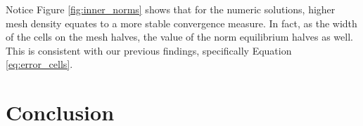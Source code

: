 \documentclass[12pt]{article}
\begin{document}
Notice Figure \ref{fig:inner_norms} shows that for the numeric solutions, higher mesh density equates to a more stable convergence measure. In fact, as the width of the cells on the mesh halves, the value of the norm equilibrium halves as well. This is consistent with our previous findings, specifically Equation \ref{eq:error_cells}.

\section{Conclusion}
\end{document}
